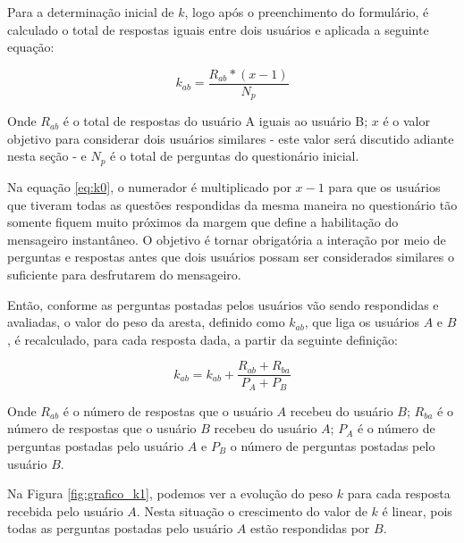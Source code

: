 Para a determinação inicial de $k$, logo após o preenchimento do formulário, é calculado o total de respostas iguais entre dois usuários e aplicada a seguinte equação:

\begin{equation}
k_{ab} = \frac{R_{ab}*(x-1)}{N_{p}}
 \label{eq:k0}
\end{equation}


Onde $R_{ab}$ é o total de respostas do usuário A iguais ao usuário B; $x$ é o valor objetivo para considerar dois usuários similares - este valor será discutido adiante nesta seção - e $N_{p}$ é o total de perguntas do questionário inicial.

Na equação \ref{eq:k0}, o numerador é multiplicado por $x-1$ para que os usuários que tiveram todas as questões respondidas da mesma maneira no questionário tão somente fiquem muito próximos da margem que define a habilitação do mensageiro instantâneo. O objetivo é tornar obrigatória a interação por meio de perguntas e respostas antes que dois usuários possam ser considerados similares o suficiente para desfrutarem do mensageiro.

Então, conforme as perguntas postadas pelos usuários vão sendo respondidas e avaliadas, o valor do peso da aresta, definido como $k_{ab}$, que liga os usuários $A$ e $B$, é recalculado, para cada resposta dada, a partir da seguinte definição:

\begin{equation}
k_{ab} = k_{ab} + \frac{R_{ab} + R_{ba}}{P_{A} + P_{B}}
\label{eq:k1}
\end{equation}

Onde $R_{ab}$ é o número de respostas que o usuário $A$ recebeu do usuário $B$; $R_{ba}$ é o número de respostas que o usuário $B$ recebeu do usuário $A$; $P_{A}$ é o número de perguntas postadas pelo usuário $A$ e $P_{B}$ o número de perguntas postadas pelo usuário $B$.

Na Figura \ref{fig:grafico_k1}, podemos ver a evolução do peso $k$ para cada resposta recebida pelo usuário $A$. Nesta situação o crescimento do valor de $k$ é linear, pois todas as perguntas postadas pelo usuário $A$ estão respondidas por $B$.

